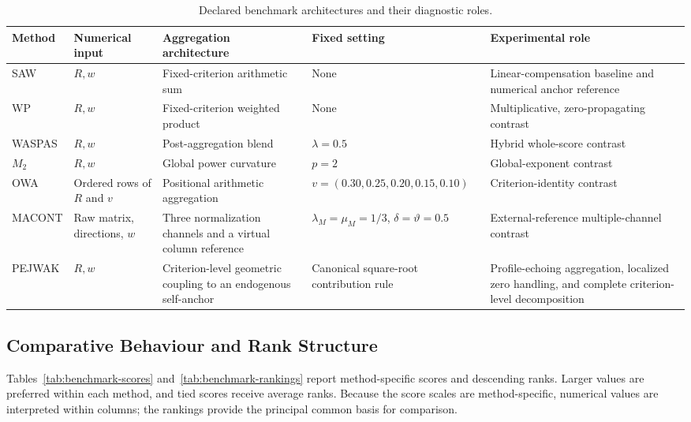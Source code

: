 \documentclass[reqno,11pt]{amsart}
\theoremstyle{definition}
\theoremstyle{plain}
\theoremstyle{remark}
\begin{document}
\begin{table}[htbp]
\centering
\footnotesize
\caption{Declared benchmark architectures and their diagnostic roles.}
\label{tab:benchmark-architecture}
\begin{tabularx}{\textwidth}{lXXXX}
\toprule
Method & Numerical input & Aggregation architecture & Fixed setting & Experimental role\\
\midrule
SAW & $R,w$ & Fixed-criterion arithmetic sum & None & Linear-compensation baseline and numerical anchor reference\\
WP & $R,w$ & Fixed-criterion weighted product & None & Multiplicative, zero-propagating contrast\\
WASPAS & $R,w$ & Post-aggregation blend & $\lambda=0.5$ & Hybrid whole-score contrast\\
$M_2$ & $R,w$ & Global power curvature & $p=2$ & Global-exponent contrast\\
OWA & Ordered rows of $R$ and $v$ & Positional arithmetic aggregation & $v=(0.30,0.25,0.20,0.15,0.10)$ & Criterion-identity contrast\\
MACONT & Raw matrix, directions, $w$ & Three normalization channels and a virtual column reference & $\lambda_M=\mu_M=1/3$, $\delta=\vartheta=0.5$ & External-reference multiple-channel contrast\\
PEJWAK
&
\(R,w\)
&
Criterion-level geometric coupling to an endogenous self-anchor
&
Canonical square-root contribution rule
&
Profile-echoing aggregation, localized zero handling, and complete
criterion-level decomposition
\\
\bottomrule
\end{tabularx}
\end{table}

\subsection{Comparative Behaviour and Rank Structure}
\label{subsec:scores-rankings}

Tables~\ref{tab:benchmark-scores} and~\ref{tab:benchmark-rankings} report method-specific scores and descending ranks. Larger values are preferred within each method, and tied scores receive average ranks. Because the score scales are method-specific, numerical values are interpreted within columns; the rankings provide the principal common basis for comparison.
\end{document}
